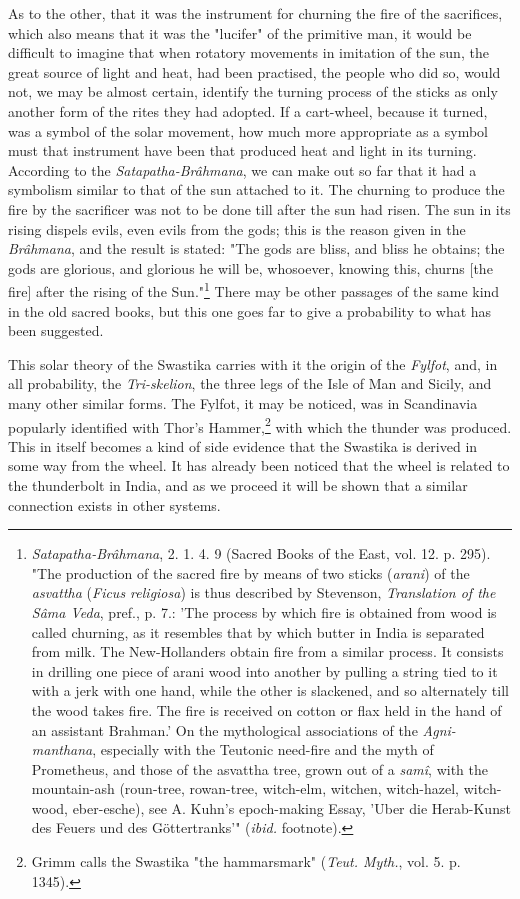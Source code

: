 \documentclass[a4paper, 11pt, oneside, polutonikogreek, english]{article}
\begin{document}
As to the other, that it was the instrument for churning the fire of the sacrifices, which also means that it was the "lucifer" of the primitive man, it would be difficult to imagine that when rotatory movements in imitation of the sun, the great source of light and heat, had been practised, the people who did so, would not, we may be almost certain, identify the turning process of the sticks as only another form of the rites they had adopted. If a cart-wheel, because it turned, was a symbol of the solar movement, how much more appropriate as a symbol must that instrument have been that produced heat and light in its turning. According to the \emph{Satapatha-Brâhmana}, we can make out so far that it had a symbolism similar to that of the sun attached to it. The churning to produce the fire by the sacrificer was not to be done till after the sun had risen. The sun in its rising dispels evils, even evils from the gods; this is the reason given in the \emph{Brâhmana}, and the result is stated: "The gods are bliss, and bliss he obtains; the gods are glorious, and glorious he will be, whosoever, knowing this, churns [the fire] after the rising of the Sun."\footnote{\emph{Satapatha-Brâhmana}, 2. 1. 4. 9 (Sacred Books of the East, vol. 12. p. 295). "The production of the sacred fire by means of two sticks (\emph{arani}) of the \emph{asvattha} (\emph{Ficus religiosa}) is thus described by Stevenson, \emph{Translation of the Sâma Veda}, pref., p. 7.: 'The process by which fire is obtained from wood is called churning, as it resembles that by which butter in India is separated from milk. The New-Hollanders obtain fire from a similar process. It consists in drilling one piece of arani wood into another by pulling a string tied to it with a jerk with one hand, while the other is slackened, and so alternately till the wood takes fire. The fire is received on cotton or flax held in the hand of an assistant Brahman.' On the mythological associations of the \emph{Agni-manthana}, especially with the Teutonic need-fire and the myth of Prometheus, and those of the asvattha tree, grown out of a \emph{samî}, with the mountain-ash (roun-tree, rowan-tree, witch-elm, witchen, witch-hazel, witch-wood, eber-esche), see A. Kuhn's epoch-making Essay, 'Uber die Herab-Kunst des Feuers und des Göttertranks'" (\emph{ibid.} footnote).} There may be other passages of the same kind in the old sacred books, but this one goes far to give a probability to what has been suggested.

This solar theory of the Swastika carries with it the origin of the \emph{Fylfot}, and, in all probability, the \emph{Tri-skelion}, the three legs of the Isle of Man and Sicily, and many other similar forms. The Fylfot, it may be noticed, was in Scandinavia popularly identified with Thor's Hammer,\footnote{Grimm calls the Swastika "the hammarsmark" (\emph{Teut. Myth.}, vol. 5. p. 1345).} with which the thunder was produced. This in itself becomes a kind of side evidence that the Swastika is derived in some way from the wheel. It has already been noticed that the wheel is related to the thunderbolt in India, and as we proceed it will be shown that a similar connection exists in other systems.
\end{document}

